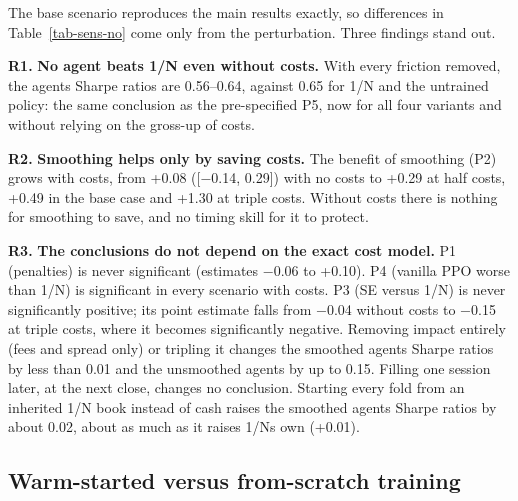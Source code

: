 \documentclass[11pt]{article}
\begin{document}
The base scenario reproduces the main results exactly, so differences in Table~\ref{tab-sens-no} come only from the perturbation. Three findings stand out.

\textbf{R1.} \textbf{No agent beats 1/N even without costs.} With every friction removed, the agents\textquotesingle{} Sharpe ratios are 0.56--0.64, against 0.65 for 1/N and the untrained policy: the same conclusion as the pre-specified P5, now for all four variants and without relying on the gross-up of costs.

\textbf{R2.} \textbf{Smoothing helps only by saving costs.} The benefit of smoothing (P2) grows with costs, from +0.08 ({[}$-$0.14, 0.29{]}) with no costs to +0.29 at half costs, +0.49 in the base case and +1.30 at triple costs. Without costs there is nothing for smoothing to save, and no timing skill for it to protect.

\textbf{R3.} \textbf{The conclusions do not depend on the exact cost model.} P1 (penalties) is never significant (estimates $-$0.06 to +0.10). P4 (vanilla PPO worse than 1/N) is significant in every scenario with costs. P3 (SE versus 1/N) is never significantly positive; its point estimate falls from $-$0.04 without costs to $-$0.15 at triple costs, where it becomes significantly negative. Removing impact entirely (fees and spread only) or tripling it changes the smoothed agents\textquotesingle{} Sharpe ratios by less than 0.01 and the unsmoothed agents\textquotesingle{} by up to 0.15. Filling one session later, at the next close, changes no conclusion. Starting every fold from an inherited 1/N book instead of cash raises the smoothed agents\textquotesingle{} Sharpe ratios by about 0.02, about as much as it raises 1/N\textquotesingle s own (+0.01).

\subsection{Warm-started versus from-scratch training}\label{warm-started-versus-from-scratch-training}
\end{document}
